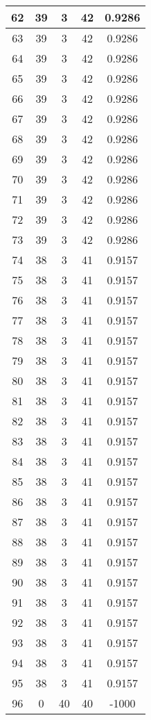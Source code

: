 \documentclass[letterpaper, 12pt]{article}
\begin{document}
\begin{longtable}{|c|c|c|c|c|}
\hline
62 & 39 & 3 & 42 & 0.9286 \\
\hline
63 & 39 & 3 & 42 & 0.9286 \\
\hline
64 & 39 & 3 & 42 & 0.9286 \\
\hline
65 & 39 & 3 & 42 & 0.9286 \\
\hline
66 & 39 & 3 & 42 & 0.9286 \\
\hline
67 & 39 & 3 & 42 & 0.9286 \\
\hline
68 & 39 & 3 & 42 & 0.9286 \\
\hline
69 & 39 & 3 & 42 & 0.9286 \\
\hline
70 & 39 & 3 & 42 & 0.9286 \\
\hline
71 & 39 & 3 & 42 & 0.9286 \\
\hline
72 & 39 & 3 & 42 & 0.9286 \\
\hline
73 & 39 & 3 & 42 & 0.9286 \\
\hline
74 & 38 & 3 & 41 & 0.9157 \\
\hline
75 & 38 & 3 & 41 & 0.9157 \\
\hline
76 & 38 & 3 & 41 & 0.9157 \\
\hline
77 & 38 & 3 & 41 & 0.9157 \\
\hline
78 & 38 & 3 & 41 & 0.9157 \\
\hline
79 & 38 & 3 & 41 & 0.9157 \\
\hline
80 & 38 & 3 & 41 & 0.9157 \\
\hline
81 & 38 & 3 & 41 & 0.9157 \\
\hline
82 & 38 & 3 & 41 & 0.9157 \\
\hline
83 & 38 & 3 & 41 & 0.9157 \\
\hline
84 & 38 & 3 & 41 & 0.9157 \\
\hline
85 & 38 & 3 & 41 & 0.9157 \\
\hline
86 & 38 & 3 & 41 & 0.9157 \\
\hline
87 & 38 & 3 & 41 & 0.9157 \\
\hline
88 & 38 & 3 & 41 & 0.9157 \\
\hline
89 & 38 & 3 & 41 & 0.9157 \\
\hline
90 & 38 & 3 & 41 & 0.9157 \\
\hline
91 & 38 & 3 & 41 & 0.9157 \\
\hline
92 & 38 & 3 & 41 & 0.9157 \\
\hline
93 & 38 & 3 & 41 & 0.9157 \\
\hline
94 & 38 & 3 & 41 & 0.9157 \\
\hline
95 & 38 & 3 & 41 & 0.9157 \\
\hline
96 & 0 & 40 & 40 & -1000 \\

\end{longtable}
\end{document}
